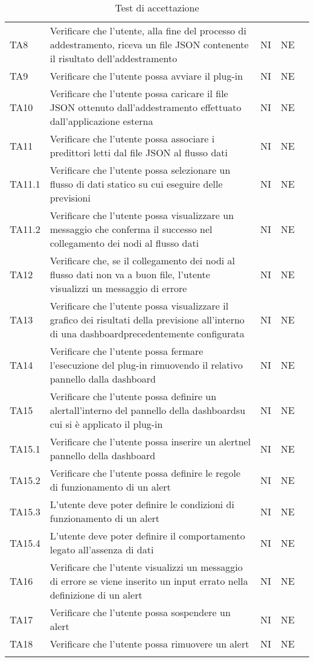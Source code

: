 \begin{longtable} {
		>{}p{15mm} 
		>{}p{79.5mm}
		>{}p{15mm} 
		>{}p{15mm}
		>{}p{0mm}}
	TA8 & Verificare che l'utente, alla fine del processo di addestramento, riceva un file JSON contenente il risultato dell'addestramento & NI & NE &\TBstrut \\ [2mm]
	TA9	& Verificare che l'utente possa avviare il plug-in & NI & NE  &\TBstrut \\ [2mm]
	TA10 & Verificare che l'utente possa caricare il file JSON ottenuto dall'addestramento effettuato dall'applicazione esterna & NI & NE  &\TBstrut \\ [2mm]
	TA11 & Verificare che l'utente possa associare i predittori letti dal file JSON al flusso dati & NI & NE  &\TBstrut \\ [2mm]
	TA11.1 & Verificare che l'utente possa selezionare un flusso di dati statico su cui eseguire delle previsioni & NI & NE  &\TBstrut \\ [2mm]
	TA11.2 & Verificare che l'utente possa visualizzare un messaggio che conferma il successo nel collegamento dei nodi al flusso dati & NI & NE  &\TBstrut \\ [2mm]
	TA12 & Verificare che, se il collegamento dei nodi al flusso dati non va a buon file, l'utente visualizzi un messaggio di errore & NI & NE  &\TBstrut \\ [2mm]
	TA13 & Verificare che l'utente possa visualizzare il grafico dei risultati della previsione all'interno di una dashboard\glosp precedentemente configurata & NI & NE  &\TBstrut \\ [2mm]
	TA14 & Verificare che l'utente possa fermare l'esecuzione del plug-in rimuovendo il relativo pannello dalla dashboard\glo & NI & NE  &\TBstrut \\ [2mm]
	TA15 & Verificare che l'utente possa definire un alert\glosp all'interno del pannello della dashboard\glosp su cui si è applicato il plug-in & NI & NE  &\TBstrut \\ [2mm]
	TA15.1 & Verificare che l'utente possa inserire un alert\glosp nel pannello della dashboard\glo & NI & NE  &\TBstrut \\ [2mm]
	TA15.2 & Verificare che l'utente possa definire le regole di funzionamento di un alert\glo & NI & NE  &\TBstrut \\ [2mm]
	TA15.3 & L'utente deve poter definire le condizioni di funzionamento di un alert\glo & NI & NE  &\TBstrut \\ [2mm]
	TA15.4 & L'utente deve poter definire il comportamento legato all'assenza di dati  & NI & NE  &\TBstrut \\ [2mm]
	TA16 & Verificare che l'utente visualizzi un messaggio di errore se viene inserito un input errato nella definizione di un alert\glo & NI & NE  &\TBstrut \\ [2mm]
	TA17 & Verificare che l'utente possa sospendere un alert\glo & NI & NE  &\TBstrut \\ [2mm]
	TA18 & Verificare che l'utente possa rimuovere un alert\glo & NI & NE  &\TBstrut \\ [2mm]
	\rowcolor{white}
	\caption{Test di accettazione}
\end{longtable}

